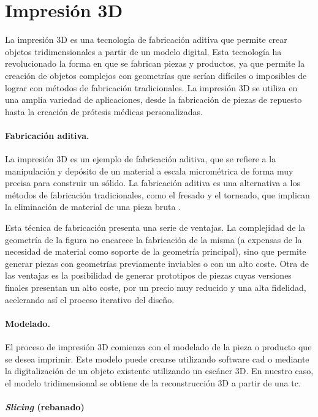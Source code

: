 \section{Impresión 3D}

La impresión 3D es una tecnología de fabricación aditiva que permite crear objetos tridimensionales a partir de un modelo digital. Esta tecnología ha revolucionado la forma en que se fabrican piezas y productos, ya que permite la creación de objetos complejos con geometrías que serían difíciles o imposibles de lograr con métodos de fabricación tradicionales. La impresión 3D se utiliza en una amplia variedad de aplicaciones, desde la fabricación de piezas de repuesto hasta la creación de prótesis médicas personalizadas.

\paragraph{Fabricación aditiva.}
La impresión 3D es un ejemplo de fabricación aditiva, que se refiere a la manipulación y depósito de un material a escala micrométrica de forma muy precisa para construir un sólido. La fabricación aditiva es una alternativa a los métodos de fabricación tradicionales, como el fresado y el torneado, que implican la eliminación de material de una pieza bruta \cite{zahera2012fabricacion}.

Esta técnica de fabricación presenta una serie de ventajas. La complejidad de la geometría de la figura no encarece la fabricación de la misma (a expensas de la necesidad de material como soporte de la geometría principal), sino que permite generar piezas con geometrías previamente inviables o con un alto coste.
Otra de las ventajas es la posibilidad de generar prototipos de piezas cuyas versiones finales presentan un alto coste, por un precio muy reducido y una alta fidelidad, acelerando así el proceso iterativo del diseño.

\paragraph{Modelado.}
El proceso de impresión 3D comienza con el modelado de la pieza o producto que se desea imprimir. Este modelo puede crearse utilizando software \acrfull{cad} o mediante la digitalización de un objeto existente utilizando un escáner 3D. En nuestro caso, el modelo tridimensional se obtiene de la reconstrucción 3D a partir de una \acrshort{tc}.

\paragraph{\emph{Slicing} (rebanado)}

